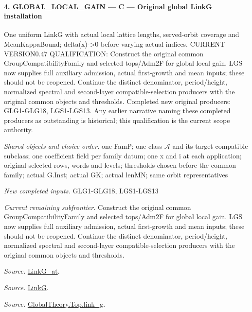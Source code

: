 \paragraph{4. GLOBAL\_\allowbreak LOCAL\_\allowbreak GAIN — C — Original global LinkG installation}

One uniform LinkG with actual local lattice lengths, served-orbit coverage and MeanKappaBound; delta(x)->0 before varying actual indices. CURRENT VERSION0.47 QUALIFICATION: Construct the original common GroupCompatibilityFamily and selected tops/Adm2F for global local gain. LGS now supplies full auxiliary admission, actual first-growth and mean inputs; these should not be reopened. Continue the distinct denominator, period/height, normalized spectral and second-layer compatible-selection producers with the original common objects and thresholds. Completed new original producers: GLG1-GLG18, LGS1-LGS13. Any earlier narrative naming these completed producers as outstanding is historical; this qualification is the current scope authority.

\emph{Shared objects and choice order.} one FamP; one class $\mathcal A$ and its target-compatible subclass; one coefficient field per family datum; one x and i at each application; original selected rows, words and levels; thresholds chosen before the common family; actual G.Inst; actual GK; actual lenMN; same orbit representatives

\emph{New completed inputs.} GLG1-GLG18, LGS1-LGS13

\emph{Current remaining subfrontier.} Construct the original common GroupCompatibilityFamily and selected tops/Adm2F for global local gain. LGS now supplies full auxiliary admission, actual first-growth and mean inputs; these should not be reopened. Continue the distinct denominator, period/height, normalized spectral and second-layer compatible-selection producers with the original common objects and thresholds.

\emph{Source.} \href{https://github.com/CocoSgt/riemann-hypothesis-lean/blob/7cbf7a0c32fca1badf05931879a37c3f8a2b03b4/src/Formalism/SharpRestriction/GlobalTheoremInputs.lean#L122-L137}{LinkG\_\allowbreak at}.

\emph{Source.} \href{https://github.com/CocoSgt/riemann-hypothesis-lean/blob/7cbf7a0c32fca1badf05931879a37c3f8a2b03b4/src/Formalism/SharpRestriction/GlobalTheoremInputs.lean#L138-L141}{LinkG}.

\emph{Source.} \href{https://github.com/CocoSgt/riemann-hypothesis-lean/blob/7cbf7a0c32fca1badf05931879a37c3f8a2b03b4/src/Development/AbelianVarietyTheory/Proofs/GlobalInterpolation/LinkG.lean#L14-L27}{GlobalTheory.Top.link\_\allowbreak g}.



